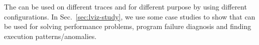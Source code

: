 


The \VDP{} can be used on different traces and for different purpose
by using different configurations.
In Sec.~\ref{sec:lviz-study}, we use some case studies to show that
\VDP{} can be used for solving performance problems,
program failure diagnosis and finding execution patterns/anomalies.

